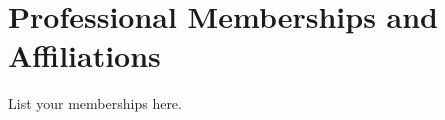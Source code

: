 \section{Professional Memberships and Affiliations}
    List your memberships here.







%


%    


